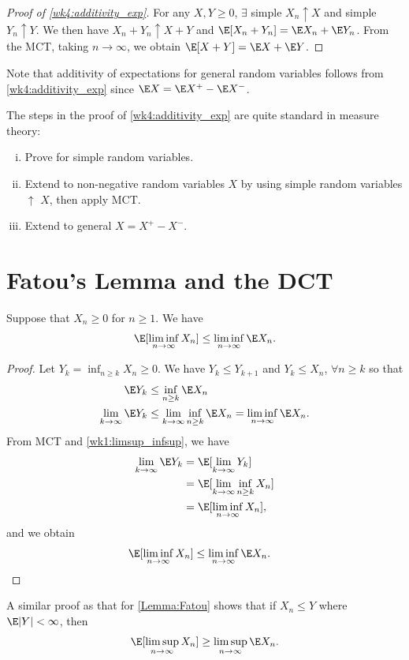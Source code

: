 \documentclass[../aipt.tex]{subfiles}
\begin{document}
\begin{proof}[Proof of \cref{wk4:additivity_exp}]
For any $X,Y\geq 0$, $\exists$ simple $X_n \uparrow X$ and simple $Y_n \uparrow Y$. We then have $X_n+Y_n \uparrow X+Y$ and $\E[X_n+Y_n] = \E X_n+ \E Y_n$. From the MCT, taking $n\to\infty$, we obtain $\E[X+Y] = \E X+ \E Y$. 
\end{proof}

Note that additivity of expectations for general random variables follows from \cref{wk4:additivity_exp} since $\E X = \E X^+ - \E X^-$.


The steps in the proof of \cref{wk4:additivity_exp} are quite standard in measure theory:
\begin{enumerate}[(i)]
\item Prove for simple random variables.
\item Extend to non-negative random variables $X$ by using simple random variables $\uparrow$ $X$, then apply MCT.
\item Extend to general $X=X^+-X^-$.
\end{enumerate}

\section{Fatou's Lemma and the DCT}

\begin{Lemma} \label{Lemma:Fatou}
Suppose that $X_n\geq 0$ for $n\geq 1$. We have
\begin{align*}
\E[\liminf_{n \to \infty}{X_n}] \leq  \liminf_{n \to \infty}\E X_n.
\end{align*}
\end{Lemma}
\begin{proof}
Let $Y_k= \inf_{n\geq k} X_n\geq 0$. We have $Y_k \leq Y_{k+1}$ and $Y_k \leq X_n$, $\forall n\geq k$ so that 
\begin{align*}
\E Y_k &\leq \inf_{n\geq k} {\E X_n} \\
\lim_{k\to \infty}{\E Y_k} &\leq \lim_{k\to \infty}{\inf_{n\geq k} {\E X_n}}= \liminf_{n\to \infty}{\E X_n}.
\end{align*}
From MCT and \cref{wk1:limsup_infsup}, we have
\begin{align*}
\lim_{k\to \infty}{\E Y_k}
&=\E[\lim_{k\to \infty} {Y_k}]\\
&=\E[\lim_{k\to \infty} {\inf_{n\geq k}{X_n}}]\\
&=\E[\liminf_{n\to \infty}{ X_n}],
\end{align*}
and we obtain
\begin{align*}
\E[\liminf_{n \to \infty}{X_n}] &\leq  \liminf_{n \to \infty}\E X_n.
\end{align*}
\end{proof}
A similar proof as that for \cref{Lemma:Fatou} shows that if $X_n \leq Y$ where $\E|Y|<\infty$, then
\begin{align*}
\E[\limsup_{n\to\infty} X_n] \geq \limsup_{n\to\infty} \E X_n.
\end{align*}
\end{document}
